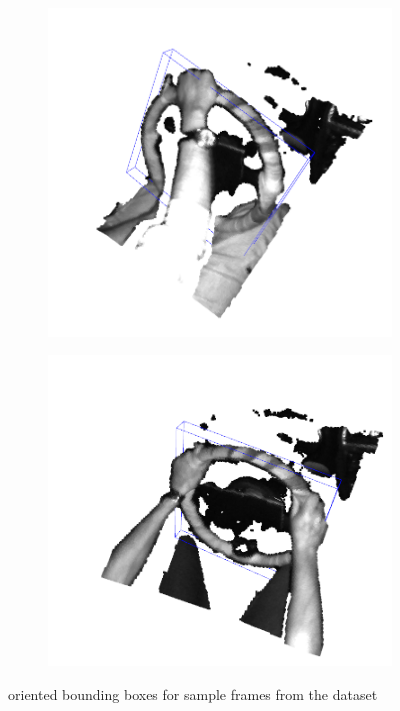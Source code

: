 \begin{figure}[ht]
\begin{subfigure}[t]{0.3\textwidth}
    \end{subfigure}\hfill
    \begin{subfigure}[t]{0.3\textwidth}
        \centering
        \includegraphics[width=\textwidth]{media/chapter 3/obb5.png}
    \end{subfigure}\hfill
    \begin{subfigure}[t]{0.3\textwidth}
        \centering
        \includegraphics[width=\textwidth]{media/chapter 3/obb6.png}
    \end{subfigure}
    \caption{oriented bounding boxes for sample frames from the dataset}
    \label{fig:sample_obbs}
\end{figure}


